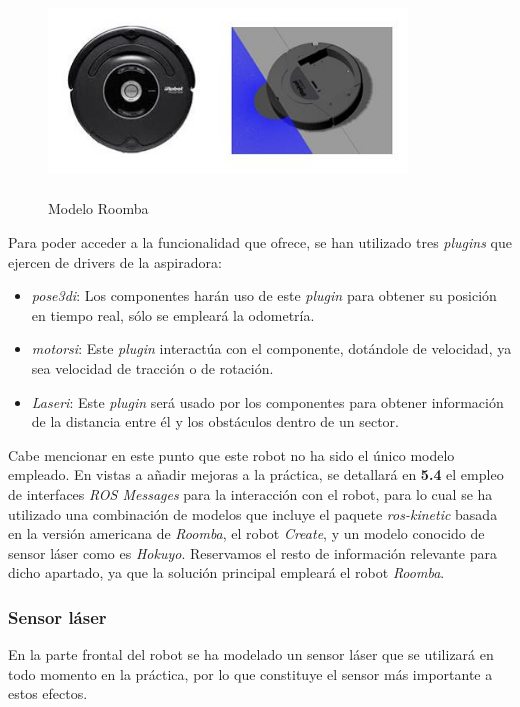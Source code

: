 \begin{figure}[H]
  \begin{center}
    \includegraphics[width=0.85\textwidth, height=5.5cm]{figures/roomba.jpg}
		\caption{Modelo Roomba}
		\label{fig.roomba}
		\end{center}
\end{figure}

Para poder acceder a la funcionalidad que ofrece, se han utilizado tres \textit{plugins} que ejercen de drivers de la aspiradora:

\begin{itemize}
	\item \textit{pose3di}: Los componentes harán uso de este \textit{plugin} para obtener su posición en tiempo real, sólo se empleará la odometría.
	\item \textit{motorsi}: Este \textit{plugin} interactúa con el componente, dotándole de velocidad, ya sea velocidad de tracción o de rotación.
	\item \textit{Laseri}: Este \textit{plugin} será usado por los componentes para obtener información de la distancia entre él y los obstáculos dentro de un sector. 
\end{itemize}

Cabe mencionar en este punto que este robot no ha sido el único modelo empleado. En vistas a añadir mejoras a la práctica, se detallará en \textbf{5.4} el empleo de interfaces \textit{ROS Messages} para la interacción con el robot, para lo cual se ha utilizado una combinación de modelos que incluye el paquete \textit{ros-kinetic} basada en la versión americana de \textit{Roomba}, el robot \textit{Create}, y un modelo conocido de sensor láser como es \textit{Hokuyo}. Reservamos el resto de información relevante para dicho apartado, ya que la solución principal empleará el robot \textit{Roomba}.

\subsubsection{Sensor láser}
En la parte frontal del robot se ha modelado un sensor láser que se utilizará en todo momento en la práctica, por lo que constituye el sensor más importante a estos efectos. 

